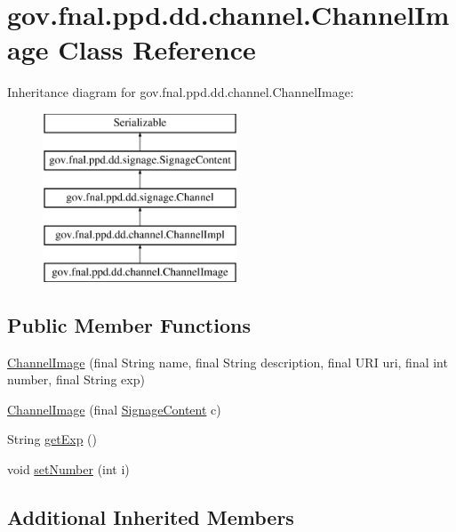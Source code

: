 \hypertarget{classgov_1_1fnal_1_1ppd_1_1dd_1_1channel_1_1ChannelImage}{\section{gov.\-fnal.\-ppd.\-dd.\-channel.\-Channel\-Image Class Reference}
\label{classgov_1_1fnal_1_1ppd_1_1dd_1_1channel_1_1ChannelImage}
}
Inheritance diagram for gov.\-fnal.\-ppd.\-dd.\-channel.\-Channel\-Image\-:\begin{figure}[H]
\begin{center}
\leavevmode
\includegraphics[height=5.000000cm]{classgov_1_1fnal_1_1ppd_1_1dd_1_1channel_1_1ChannelImage}
\end{center}
\end{figure}
\subsection*{Public Member Functions}
\begin{DoxyCompactItemize}
\item 
\hyperlink{classgov_1_1fnal_1_1ppd_1_1dd_1_1channel_1_1ChannelImage_ab18718b659f333b1858606312779339c}{Channel\-Image} (final String name, final String description, final U\-R\-I uri, final int number, final String exp)
\item 
\hyperlink{classgov_1_1fnal_1_1ppd_1_1dd_1_1channel_1_1ChannelImage_a5e00f8dc7d13b8d9186dbbea54f5205a}{Channel\-Image} (final \hyperlink{interfacegov_1_1fnal_1_1ppd_1_1dd_1_1signage_1_1SignageContent}{Signage\-Content} c)
\item 
String \hyperlink{classgov_1_1fnal_1_1ppd_1_1dd_1_1channel_1_1ChannelImage_a3b35ca4da6e88f0f2f2e18fd2c4be85e}{get\-Exp} ()
\item 
void \hyperlink{classgov_1_1fnal_1_1ppd_1_1dd_1_1channel_1_1ChannelImage_ae2edd21f7326063ec9aa3f0828c4398b}{set\-Number} (int i)
\end{DoxyCompactItemize}
\subsection*{Additional Inherited Members}


